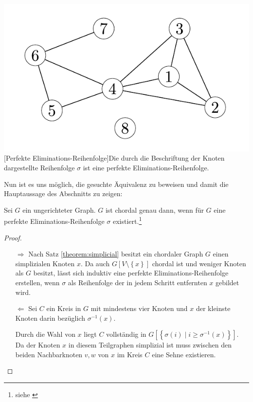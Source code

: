 \vspace{1em}
\begin{minipage}{\linewidth}
	\centering
	\includegraphics[scale=0.9]{img/graph/peo.pdf}
	[Perfekte Eliminations-Reihenfolge]{Die durch die Beschriftung der Knoten dargestellte Reihenfolge \( \sigma \) ist eine perfekte Eliminations-Reihenfolge.}
	\label{fig:peo}
\end{minipage}

Nun ist es uns möglich, die gesuchte Äquivalenz zu beweisen und damit die Hauptaussage des Abschnitts zu zeigen:

\begin{theorem}
	Sei \( G \) ein ungerichteter Graph. \( G \) ist chordal genau dann, wenn für \( G \) eine perfekte Eliminations-Reihenfolge \( \sigma \) existiert.\footnote{siehe \cite[Satz 4.1 (i) \( \Leftrightarrow \) (ii)]{golumbic}}
	\label{theorem:chordalpeo}
\end{theorem}

\begin{proof}
	\begin{itemize}
		\item[\(\Rightarrow\)]
		      Nach Satz \ref{theorem:simplicial} besitzt ein chordaler Graph \( G \) einen simplizialen Knoten \( x \). Da auch \( G \left[ V \setminus \left\lbrace x \right\rbrace \right] \) chordal ist und weniger Knoten als \( G \) besitzt, lässt sich induktiv eine perfekte Eliminations-Reihenfolge erstellen, wenn \( \sigma \) als Reihenfolge der in jedem Schritt entfernten \( x \) gebildet wird.

		\item[\(\Leftarrow\)]
		      Sei \( C \) ein Kreis in \( G \) mit mindestens vier Knoten und \( x \) der kleinste Knoten darin bezüglich \( \sigma^{-1} \left( x \right) \).

		      Durch die Wahl von \( x \) liegt \( C \) vollständig in \( G \left[ \left\lbrace \sigma \left( i \right) \mid i \geq \sigma^{-1} \left( x \right) \right\rbrace \right] \). Da der Knoten \( x \) in diesem Teilgraphen simplizial ist muss zwischen den beiden Nachbarknoten \( v, w \) von \( x \) im Kreis \( C \) eine Sehne existieren.
	\end{itemize}
\end{proof}
